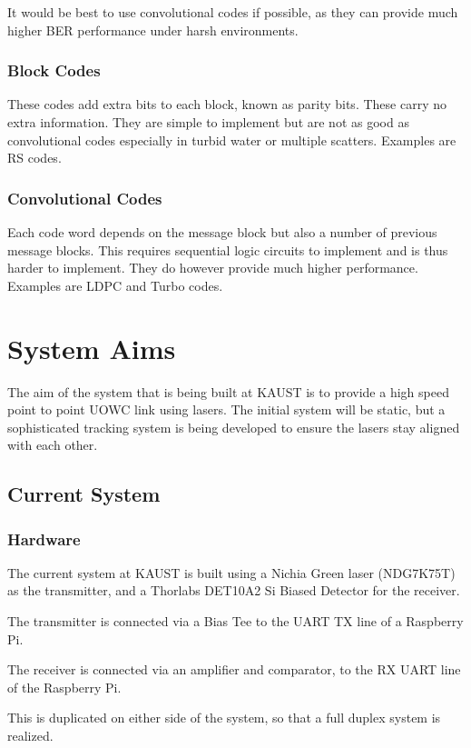 \documentclass{article}
\begin{document}
It would be best to use convolutional codes if possible, as they can provide much higher \ac{BER} performance under harsh environments.

\subsubsection{Block Codes}
These codes add extra bits to each block, known as parity bits. These carry no extra information. They are simple to implement but are not as good as convolutional codes especially in turbid water or multiple scatters. Examples are \ac{RS} codes.

\subsubsection{Convolutional Codes}
Each code word depends on the message block but also a number of previous message blocks. This requires sequential logic circuits to implement and is thus harder to implement. They do however provide much higher performance. Examples are \ac{LDPC} and Turbo codes.

\section{System Aims}
The aim of the system that is being built at \ac{KAUST} is to provide a high speed point to point \ac{UOWC} link using lasers. The initial system will be static, but a sophisticated tracking system is being developed to ensure the lasers stay aligned with each other.

\subsection{Current System}

\subsubsection{Hardware}
The current system at \ac{KAUST} is built using a Nichia Green laser (NDG7K75T) as the transmitter, and a Thorlabs DET10A2 Si Biased Detector for the receiver.

The transmitter is connected via a Bias Tee to the UART TX line of a Raspberry Pi.

The receiver is connected via an amplifier and comparator, to the RX UART line of the Raspberry Pi.

This is duplicated on either side of the system, so that a full duplex system is realized.
\end{document}
